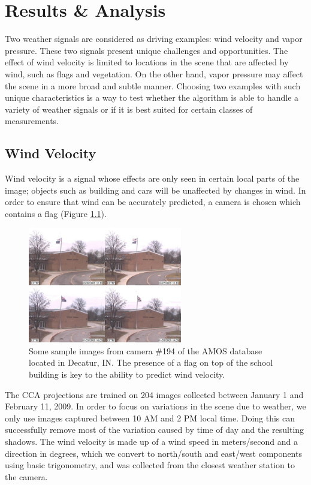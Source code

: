 \chapter{Results \& Analysis}
\label{cpt:results}
Two weather signals are considered as driving examples: wind velocity and vapor pressure. These two signals present unique challenges and opportunities. The effect of wind velocity is limited to locations in the scene that are affected by wind, such as flags and vegetation. On the other hand, vapor pressure may affect the scene in a more broad and subtle manner. Choosing two examples with such unique characteristics is a way to test whether the algorithm is able to handle a variety of weather signals or if it is best suited for certain classes of measurements.

\section{Wind Velocity}
Wind velocity is a signal whose effects are only seen in certain local parts of the image; objects such as building and cars will be unaffected by changes in wind. In order to ensure that wind can be accurately predicted, a camera is chosen which contains a flag (Figure \ref{fig:windspeedextremes}). 
\begin{figure}
	\centering
		\includegraphics[width=0.60\textwidth]{figures/windspeedextremes.jpg}
	\caption[Some sample images from camera $\#$194 of the AMOS database located in Decatur, IN]{Some sample images from camera $\#$194 of the AMOS database located in Decatur, IN. The presence of a flag on top of the school building is key to the ability to predict wind velocity.}
	\label{fig:windspeedextremes}
\end{figure}

The CCA projections are trained on 204 images collected between January 1 and February 11, 2009. In order to focus on variations in the scene due to weather, we only use images captured between 10 AM and 2 PM local time. Doing this can successfully remove most of the variation caused by time of day and the resulting shadows. The wind velocity is made up of a wind speed in meters/second and a direction in degrees, which we convert to north/south and east/west components using basic trigonometry, and was collected from the closest weather station to the camera. 


